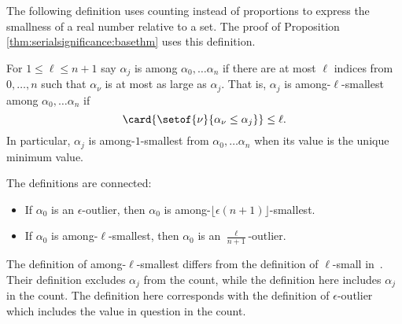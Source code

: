 \documentclass[12pt]{article}
\begin{document}
The following definition uses counting instead of proportions to express
the smallness of a real number relative to a set.  The proof of
Proposition~%
\ref{thm:serialsignificance:basethm} uses this definition.

\begin{definition}
    For \( 1 \le \ell \le n+1 \) say \( \alpha_j \) is %
    among \( \alpha_0, \dots \alpha_n \) if there are at most \( \ell \)
    indices from \( 0, \dots, n \) such that \( \alpha_{\nu} \) is at
    most as large as \( \alpha_j \).  That is, \( \alpha_j \) is among-\(
    \ell \)-smallest among \( \alpha_0, \dots \alpha_n \) if
    \[
        \card{ \setof{\nu}{\alpha_{\nu} \le \alpha_j}} \le \ell.
    \] In particular, \( \alpha_j \) is among-\( 1 \)-smallest from \(
    \alpha_0, \dots \alpha_n \) when its value is the unique minimum
    value.
\end{definition}

\begin{remark}
    The definitions are connected:
    \begin{itemize}
        \item
            If \( \alpha_0 \) is an \( \epsilon \)-outlier, then \(
            \alpha_0 \) is among-\( \lfloor \epsilon (n+1) \rfloor \)-smallest.
        \item
            If \( \alpha_0 \) is among-\( \ell \)-smallest, then \(
            \alpha_0 \) is an \( \frac{\ell}{n+1} \)-outlier.
    \end{itemize}
\end{remark}

\begin{remark}
  The definition of among-\( \ell \)-smallest differs from the
  definition of \(\ell\)-small in~\cite{Chikina2860}.  Their
  definition excludes \( \alpha_j \) from the count, while the
  definition here includes \( \alpha_j \) in the count.  The
  definition here corresponds with the definition of \( \epsilon
  \)-outlier which includes the value in question in the count.
\end{remark}
\end{document}
